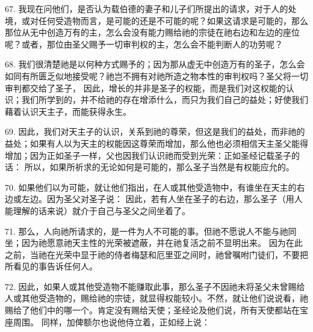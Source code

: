 \par

67. 我现在问他们，是否认为载伯德的妻子和儿子们所提出的请求，对于人的处境，或对任何受造物而言，是可能的还是不可能的呢？如果这请求是可能的，那么那位从无中创造万有的主，怎么会没有能力赐给祂的宗徒在祂右边和左边的座位呢？或者，那位由圣父赐予一切审判权的主，怎么会不能判断人的功劳呢？\par

68. 我们很清楚祂是以何种方式赐予的；因为那从虚无中创造万有的圣子，怎么会如同有所匮乏似地接受呢？祂岂不拥有对祂所造之物本性的审判权吗？圣父将一切审判都交给了圣子， 因此，增长的并非是圣子的权能，而是我们对这权能的认识；我们所学到的，并不给祂的存在增添什么，而只为我们自己的益处；好使我们藉着认识天主子，而能获得永生。\par

69. 因此，我们对天主子的认识，关系到祂的尊荣，但这是我们的益处，而非祂的益处；如果有人以为天主的权能因这尊荣而增加，那么他也必须相信天主圣父能得增加；因为正如圣子一样，父也因我们认识祂而受到光荣：正如圣经记载圣子的话： 所以，如果所祈求的无论如何是可能的，那么圣子当然是有权能应允的。\par

70. 如果他们以为可能，就让他们指出，在人或其他受造物中，有谁坐在天主的右边或左边。因为圣父对圣子说： 因此，若有人坐在圣子的右边，那么圣子（用人能理解的话来说）就介于自己与圣父之间坐着了。\par

71. 那么，人向祂所请求的，是一件为人不可能的事。但祂不愿说人不能与祂同坐；因为祂愿意祂天主性的光荣被遮蔽，并在祂复活之前不显明出来。 因为在此之前，当祂在光荣中显于祂的侍者梅瑟和厄里亚之间时，祂曾嘱咐门徒们，不要把所看见的事告诉任何人。\par

72. 因此，如果人或其他受造物不能赚取此事，那么圣子不因祂未将圣父未曾赐给人或其他受造物的，赐给祂的宗徒，就显得权能较小。不然，就让他们说说看，祂赐给了他们中的哪一个。肯定没有赐给天使；圣经论及他们说，所有天使都站在宝座周围。 同样，加俾额尔也说他侍立着，正如经上说：\par

